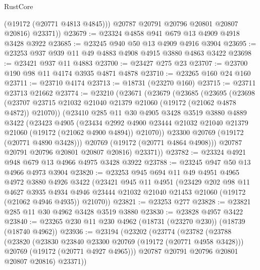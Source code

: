 \begin{lexlean}{RustCore}
\begin{coremodule}
            (@19172 (@20771 @4813 @4845)))
          @20787
          @20791
          @20796
          @20801
          @20807
          @20816)
        @23371))
@23679 := @23324 @4858 @941 @679 @13 @4909 @4918 @3428 @3922
@23685 := @23245 @940 @50 @13 @4909 @4916 @3904
@23695 := @23253 @937 @939 @11 @49 @4883 @4908 @4915 @3880 @4863 @3422
@23698 := @23421 @937 @11 @4883
@23700 := @23427 @275 @23
@23707 := @23700 @190 @98 @11 @4174 @3935 @4871 @4878
@23710 := @23265 @160 @24 @160
@23711 := @23710 @4174
@23713 := @18731 (@23270 @160)
@23715 := @23711 @23713 @21662
@23774 := @23210
    (@23671
      (@23679
        (@23685
          (@23695
            (@23698
              (@23707 @23715 @21032 @21040 @21379 @21060 (@19172 (@21062 @4878 @4872)) @21070))
            (@23410
              @285
              @11
              @30
              @4905
              @3428
              @3519
              @3880
              @4889
              @3422
              (@23423
                @4905
                (@23434
                  @2992
                  @4900
                  @23444
                  @21032
                  @21040
                  @21379
                  @21060
                  (@19172 (@21062 @4900 @4894))
                  @21070))
              @23300
              @20769
              (@19172 (@20771 @4890 @3428)))
            @20769
            (@19172 (@20771 @4864 @4908)))
          @20787
          @20791
          @20796
          @20801
          @20807
          @20816)
        @23371))
@23782 := @23324 @4921 @948 @679 @13 @4966 @4975 @3428 @3922
@23788 := @23245 @947 @50 @13 @4966 @4973 @3904
@23820 := @23253
    @945
    @694
    @11
    @49
    @4951
    @4965
    @4972
    @3880
    @4926
    @3422
    (@23421
      @945
      @11
      @4951
      (@23429
        @202
        @98
        @11
        @4627
        @3935
        @4934
        @4946
        @23444
        @21032
        @21040
        @21453
        @21060
        (@19172 (@21062 @4946 @4935))
        @21070))
@23821 := @23253 @277
@23828 := @23821 @285 @11 @30 @4962 @3428 @3519 @3880
@23830 := @23828 @4957 @3422
@23840 := @23265 @230 @11 @230 @4962 (@18731 (@23270 @230)) (@18739 (@18740 @4962))
@23936 := @23194
    (@23202
      (@23774
        (@23782
          (@23788
            (@23820
              (@23830 @23840 @23300 @20769 (@19172 (@20771 @4958 @3428)))
              @20769
              (@19172 (@20771 @4927 @4965)))
            @20787
            @20791
            @20796
            @20801
            @20807
            @20816)
          @23371))

\end{coremodule}
\end{lexlean}
